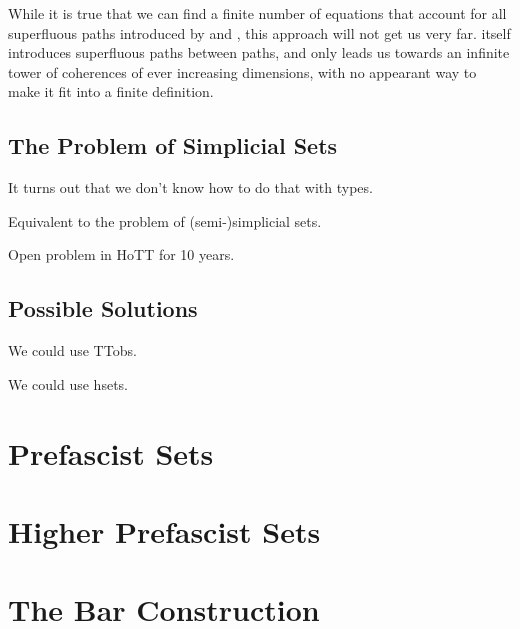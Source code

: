 While it is true that we can find a finite number of equations that account for 
all superfluous paths introduced by  and , this 
approach will not get us very far. 
% 
 itself introduces superfluous paths between paths, and only
leads us towards an infinite tower of coherences of ever increasing 
dimensions, with no appearant way to make it fit into a finite definition.

\subsection{The Problem of Simplicial Sets}

It turns out that we don't know how to do that with types.

Equivalent to the problem of (semi-)simplicial sets.

Open problem in HoTT for 10 years.


\subsection{Possible Solutions}

We could use TTobs.

We could use hsets.

\section{Prefascist Sets}

\section{Higher Prefascist Sets}

\section{The Bar Construction}